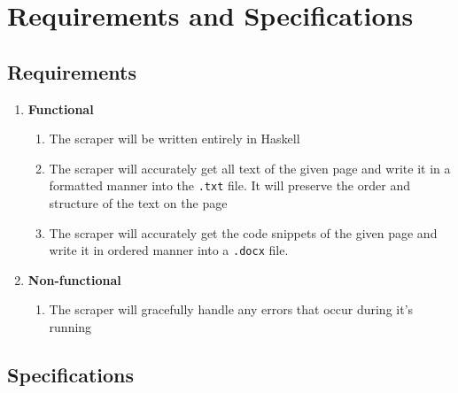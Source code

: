 \documentclass{scrreprt}
\begin{document}
\chapter{Requirements and Specifications}

\section{Requirements}

\begin{enumerate}
    \item \textbf{Functional}
    \begin{enumerate}
        \item The scraper will be written entirely in Haskell
        \item The scraper will accurately get all text of the given page and write it in a formatted manner into the \texttt{.txt} file. It will preserve the order and structure of the text on the page
        \item The scraper will accurately get the code snippets of the given page and write it in ordered manner into a \texttt{.docx} file.
    \end{enumerate}
    
    \item \textbf{Non-functional}
    \begin{enumerate}
        \item The scraper will gracefully handle any errors that occur during it's running
    \end{enumerate}
        
\end{enumerate}


\section{Specifications}
\end{document}
